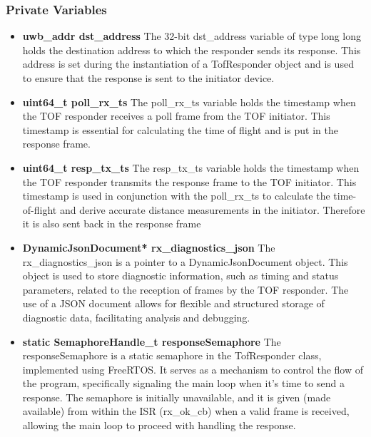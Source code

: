 \subsubsection{Private Variables}
\begin{itemize}
	\item \textbf{uwb\_addr dst\_address}
	\newline
	The 32-bit dst\_address variable of type long long holds the destination address to which the responder sends its response. This address is set during the instantiation of a TofResponder object and is used to ensure that the response is sent to the initiator device.
	
	\item \textbf{uint64\_t poll\_rx\_ts}
	\newline
	The poll\_rx\_ts variable holds the timestamp when the TOF responder receives a poll frame from the TOF initiator. This timestamp is essential for calculating the time of flight and is put in the response frame. 
	
	\item \textbf{uint64\_t resp\_tx\_ts}
	\newline
	The resp\_tx\_ts variable holds the timestamp when the TOF responder transmits the response frame to the TOF initiator. 
	This timestamp is used in conjunction with the poll\_rx\_ts to calculate the time-of-flight and derive accurate distance measurements in the initiator. 
	Therefore it is also sent back in the response frame
	
	\item \textbf{DynamicJsonDocument* rx\_diagnostics\_json}
	\newline
	The rx\_diagnostics\_json is a pointer to a DynamicJsonDocument object. 
	This object is used to store diagnostic information, such as timing and status parameters, related to the reception of frames by the TOF responder. 
	The use of a JSON document allows for flexible and structured storage of diagnostic data, facilitating analysis and debugging.
	
	\item \textbf{static SemaphoreHandle\_t responseSemaphore}
	\newline
	The responseSemaphore is a static semaphore in the TofResponder class, implemented using FreeRTOS. 
	It serves as a mechanism to control the flow of the program, specifically signaling the main loop when it's time to send a response. 
	The semaphore is initially unavailable, and it is given (made available) from within the ISR (rx\_ok\_cb) when a valid frame is received, allowing the main loop to proceed with handling the response.
	
\end{itemize}

